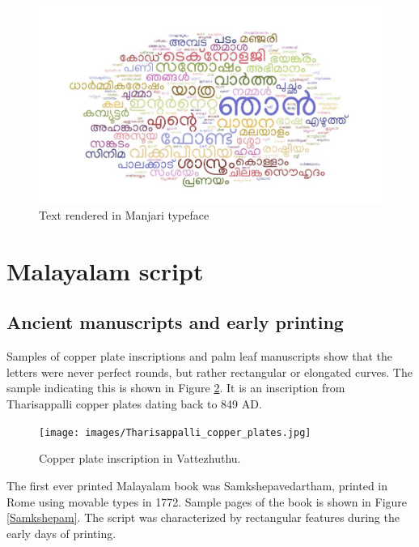 \documentclass[11pt,twoside,a4paper,parskip=half]{scrartcl}
\begin{document}
\begin{figure}[h!]
	\includegraphics[width=\textwidth]{images/wordcloud.jpg}
	\caption{Text rendered in Manjari typeface}
	\label{wordcloud}
\end{figure} 

\section{Malayalam script}

\subsection{Ancient manuscripts and early printing}

Samples of copper plate inscriptions and palm leaf manuscripts show that the letters were never perfect rounds, but rather rectangular or elongated curves. The sample indicating this is shown in Figure \ref{vattezhuthu}. It is an inscription from Tharisappalli copper plates dating back to 849 AD.


\begin{figure}[h!]
	\texttt{[image: images/Tharisappalli\_copper\_plates.jpg]}
	\caption{Copper plate inscription in Vattezhuthu.}
	\label{vattezhuthu}
\end{figure} 

The first ever printed Malayalam book was Samkshepavedartham\cite{samkshepavedartham}, printed in Rome using movable types in 1772. Sample pages of the book is shown in Figure \ref{Samkshepam}. The script was characterized by rectangular features during the early days of printing. 
\end{document}

